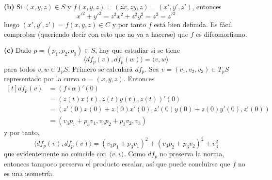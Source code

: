 \documentclass[12pt]{report}
\begin{document}
\textbf{(b) } Si $(x,y,z) \in S$ y $f(x,y,z) = (zx,zy,z) = (x',y',z')$, entonces
\[x'^2+y'^2 = z^2x^2+z^2y^2 = z^2 = z'^2\]
luego $(x',y',z') = f(x,y,z) \in C$ y por tanto $f$ está bien definida. Es fácil comprobar (queriendo decir con esto que no va a hacerse) que $f$ es difeomorfismo.

\vspace{2mm}
\textbf{(c) } Dado $p = (p_1,p_2,p_3) \in S$, hay que estudiar si se tiene
\[\langle df_p(v),df_p(w) \rangle = \langle v,w \rangle\]
para todos $v,w\in T_pS$. Primero se calculará $df_p$. Sea $v = (v_1,v_2,v_3) \in T_pS$ representado por la curva $\alpha = (x,y,z)$. Entonces
\[
\begin{aligned}[t]
df_p(v) &= (f \circ \alpha)'(0) \\
&= (z(t)x(t),z(t)y(t),z(t))'(0) \\
&= (z'(0)x(0)+z(0)x'(0),z'(0)y(0)+z(0)y'(0),z'(0)) \\
&= (v_3p_1+p_3v_1,v_3p_2+p_3v_2,v_3)
\end{aligned}
\]
y por tanto,
\[\langle df_p(v),df_p(v) \rangle = (v_3p_1+p_3v_1)^2+(v_3p_2+p_3v_2)^2+v_3^2\]
que evidentemente no coincide con $\langle v,v \rangle$. Como $df_p$ no preserva la norma, entonces tampoco preserva el producto escalar, así que puede concluirse que $f$ no es una isometría.
\end{document}
